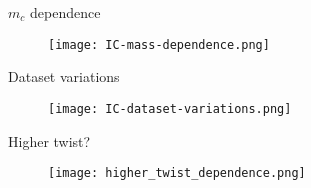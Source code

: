 \begin{frame}{$m_c$ dependence}
  \begin{figure}
    \texttt{[image: IC-mass-dependence.png]}
  \end{figure}
\end{frame}

\begin{frame}{Dataset variations}
  \begin{figure}
    \texttt{[image: IC-dataset-variations.png]}
  \end{figure}
\end{frame}

\begin{frame}{Higher twist?}
  \begin{figure}
    \texttt{[image: higher\_twist\_dependence.png]}
  \end{figure}
\end{frame}